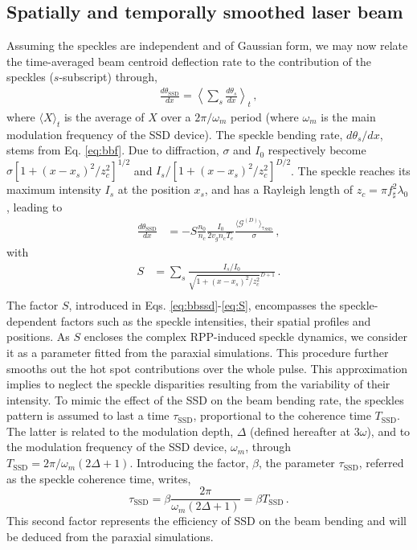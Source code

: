 \documentclass[%
 reprint,
 amsmath,amssymb,
 aps,
]{revtex4-1}
\begin{document}
\subsection{ Spatially and temporally smoothed laser beam } \label{sec:gaussssd}
Assuming the speckles are independent and of Gaussian form, we may now relate the time-averaged beam centroid deflection rate to the  contribution of the speckles ($s$-subscript) through, 
\begin{align} 
  \frac{d\theta_\mathrm{SSD}}{dx}  =   \left\langle \sum_s\frac{d\theta_s}{dx}\right\rangle_t \, , \label{eq:dtheta_ssd}
  \end{align}
  where   $\langle X\rangle_t$ is the  average of $X$ over a $2\pi/\omega_m$ period (where $\omega_m$  is the main modulation frequency of the SSD device). The speckle bending rate, $d\theta_s/dx$, stems from Eq. \eqref{eq:bbf}.
Due to diffraction, $\sigma$ and $I_0$ respectively become $\sigma[1+(x-x_s)^2/z_c^2]^{1/2}$ and  $I_s/[1+(x-x_s)^2/z_c^2]^{D/2}$. The speckle reaches its maximum intensity $I_s$ at the position $x_s$, and has a Rayleigh length of  $z_c=\pi f_\sharp^2\lambda_0$, leading to 
  \begin{align}
 \frac{d\theta_\mathrm{SSD}}{dx}  &=   -S    \frac{n_0 }{n_c}  \frac{  I_0 }{ 2 v_g n_c T_e }    \frac{\langle \mathcal{G}^{(D)} \rangle_\mathrm{\tau_\mathrm{SSD}}}{ \sigma}      \, ,  \label{eq:bbssd}
   \end{align}
 with 
   \begin{align}\label{eq:S}
   S &=\sum_s \frac{I_s/I_0}{\sqrt{1+ {(x-x_s)^2}/{z_c^2}}^{D+1}}  \, . \nonumber \\
  \end{align}
The factor $S$, introduced in Eqs. \eqref{eq:bbssd}-\eqref{eq:S}, encompasses the speckle-dependent factors such as the speckle intensities, their spatial profiles and positions. As $S$ encloses the complex RPP-induced speckle dynamics,  we consider it as a parameter fitted from the paraxial simulations. This procedure further smooths out the hot spot contributions over the whole pulse.  This approximation implies to neglect the speckle disparities resulting from the variability of their intensity. 
To mimic the effect of the SSD on the beam bending rate,  the speckles pattern is assumed to last a  time $\tau_\mathrm{SSD}$, proportional to the coherence time $T_\mathrm{SSD}$. The latter is  related to the modulation depth, $\Delta$ (defined hereafter at $3\omega$), and to the  modulation frequency of the SSD device, $\omega_m$, through $T_\mathrm{SSD}=2\pi/\omega_m (2\Delta +1)$. Introducing the factor, $\beta$, the parameter $\tau_\mathrm{SSD}$, referred as the speckle coherence time, writes,  
\begin{equation}
    \tau_\mathrm{SSD} = \beta \frac{2\pi}{\omega_m (2\Delta +1)} =\beta T_\mathrm{SSD}\, . \label{eq:taussd}
\end{equation}
This second factor represents the efficiency of SSD on the beam bending and  will be deduced from the paraxial simulations. 
\end{document}
